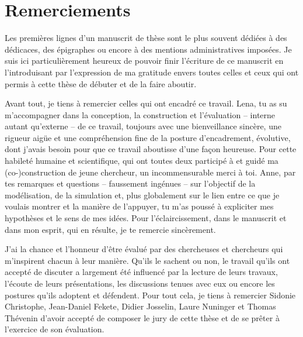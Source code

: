\chapter*{Remerciements}
Les premières lignes d'un manuscrit de thèse sont le plus souvent dédiées à des dédicaces, des épigraphes ou encore à des mentions administratives imposées.
Je suis ici particulièrement heureux de pouvoir finir l'écriture de ce manuscrit en l'introduisant par l'expression de ma gratitude envers toutes celles et ceux qui ont permis à cette thèse de débuter et de la faire aboutir.

Avant tout, je tiens à remercier celles qui ont encadré ce travail.
Lena, tu as su m'accompagner dans la conception, la construction et l'évaluation -- interne autant qu'externe -- de ce travail, toujours avec une bienveillance sincère, une rigueur aigüe et une compréhension fine de la posture d'encadrement, évolutive, dont j'avais besoin pour que ce travail aboutisse d'une façon heureuse.
Pour cette habileté humaine et scientifique, qui ont toutes deux participé à et guidé ma (co-)construction de jeune chercheur, un \og incommensurable\fg{} merci à toi.
Anne, par tes remarques et questions -- faussement ingénues -- sur l'objectif de la modélisation, de la simulation et, plus globalement sur le lien entre ce que je voulais montrer et la manière de l'appuyer, tu m'as poussé à expliciter mes hypothèses et le sens de mes idées.
Pour l'éclaircissement, dans le manuscrit et dans mon esprit, qui en résulte, je te remercie sincèrement.

J'ai la chance et l'honneur d'être évalué par des chercheuses et chercheurs qui m'inspirent chacun à leur manière.
Qu'ils le sachent ou non, le travail qu'ils ont accepté de discuter a largement été influencé par la lecture de leurs travaux, l'écoute de leurs présentations, les discussions tenues avec eux ou encore les postures qu'ils adoptent et défendent.
Pour tout cela, je tiens à remercier Sidonie Christophe, Jean-Daniel Fekete, Didier Josselin, Laure Nuninger et Thomas Thévenin d'avoir accepté de composer le jury de cette thèse et de se prêter à l'exercice de son évaluation.

